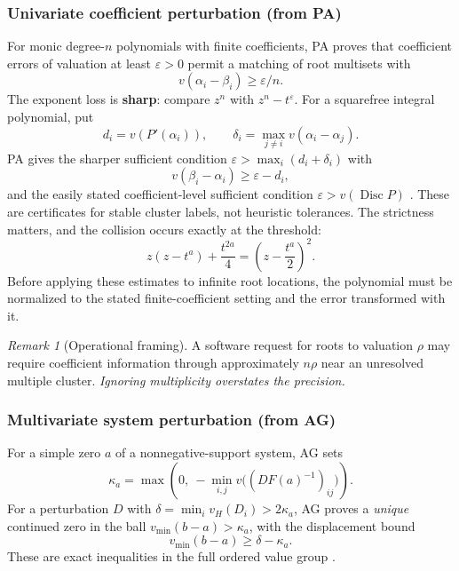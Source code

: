 \documentclass[11pt,letterpaper]{article}
\numberwithin{equation}{section}
\theoremstyle{definition}
\theoremstyle{remark}
\newtheorem{remark}[theorem]{Remark}
\newcommand{\Disc}{\operatorname{Disc}}
\begin{document}
\subsubsection{Univariate coefficient perturbation (from PA)}
\label{cas:subsub-univariate}
For monic degree-$n$ polynomials with finite coefficients, PA proves that
coefficient errors of valuation at least $\varepsilon>0$ permit a matching of
root multisets with
\begin{equation}\label{cas:eq-rootmatch}
 v(\alpha_i-\beta_i)\ge\varepsilon/n .
\end{equation}
The exponent loss is \textbf{sharp}: compare $z^n$ with $z^n-t^\varepsilon$.
For a squarefree integral polynomial, put
\[
 d_i=v(P'(\alpha_i)),\qquad \delta_i=\max_{j\ne i}v(\alpha_i-\alpha_j).
\]
PA gives the sharper sufficient condition $\varepsilon>\max_i(d_i+\delta_i)$
with
\[
 v(\beta_i-\alpha_i)\ge\varepsilon-d_i ,
\]
and the easily stated coefficient-level sufficient condition
$\varepsilon>v(\Disc P)$ \cite{cas:SourcePolynomial}. These are certificates for
stable cluster labels, not heuristic tolerances. The strictness matters, and the
collision occurs exactly at the threshold:
\begin{equation}\label{cas:eq-collision}
 z(z-t^a)+\frac{t^{2a}}4=\left(z-\frac{t^a}2\right)^{\!2} .
\end{equation}
Before applying these estimates to infinite root locations, the polynomial must
be normalized to the stated finite-coefficient setting and the error transformed
with it.

\begin{remark}[Operational framing]\label{cas:rem-univariateops}
A software request for roots to valuation $\rho$ may require coefficient
information through approximately $n\rho$ near an unresolved multiple cluster.
\emph{Ignoring multiplicity overstates the precision.}
\end{remark}

\subsubsection{Multivariate system perturbation (from AG)}
\label{cas:subsub-multivariate}
For a simple zero $a$ of a nonnegative-support system, AG sets
\begin{equation}\label{cas:eq-kappa}
 \kappa_a=\max\!\left(0,\ -\min_{i,j}v\bigl((DF(a)^{-1})_{ij}\bigr)\right).
\end{equation}
For a perturbation $D$ with $\delta=\min_iv_H(D_i)>2\kappa_a$, AG proves a
\emph{unique} continued zero in the ball $v_{\min}(b-a)>\kappa_a$, with the
displacement bound
\begin{equation}\label{cas:eq-displacement}
 v_{\min}(b-a)\ge\delta-\kappa_a .
\end{equation}
These are exact inequalities in the full ordered value group
\cite{cas:SourceAG}.
\end{document}
